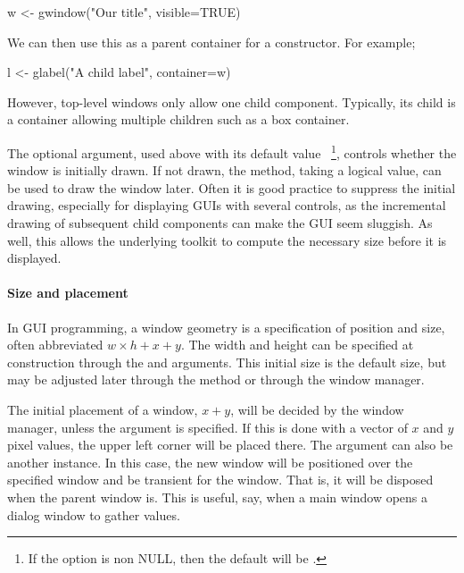 \begin{Schunk}
\begin{Sinput}
 w <- gwindow("Our title", visible=TRUE)
\end{Sinput}
\end{Schunk}
%

We can then use this as a parent container for a constructor. For example;
\begin{Schunk}
\begin{Sinput}
 l <- glabel("A child label", container=w)
\end{Sinput}
\end{Schunk}
%
However, top-level windows only allow one child component. Typically, its child
is a container allowing multiple children such as a box container.


The optional  argument, used above with its
default value ~\footnote{If the option
 is non NULL, then the
default will be .}, controls whether the
window is initially drawn. If not drawn, the
 method, taking a logical value, can
be used to draw the window later.  Often it is good practice to suppress
the initial drawing, especially for displaying GUIs with several
controls, as the incremental drawing of subsequent child components can
make the GUI seem sluggish. As well, this allows the underlying
toolkit to compute the necessary size before it is displayed.


\paragraph{Size and placement}
In GUI programming, a window geometry is a specification of position
and size, often abbreviated $w \times h + x + y$. The width and height
can be specified at construction through the 
and  arguments. This initial size is the
default size, but may be adjusted later through the
 method or through the window manager. 

The initial placement of a window, $x+y$, will be decided by the
window manager, unless the  argument is
specified. If this is done with a vector of $x$ and $y$ pixel values,
the upper left corner will be placed there. The  argument
can also be another  instance. In this case, the new
window will be positioned over the specified window and be transient
for the window. That is, it will be disposed when the parent window
is. This is useful, say, when a main window opens a dialog window to
gather values.

